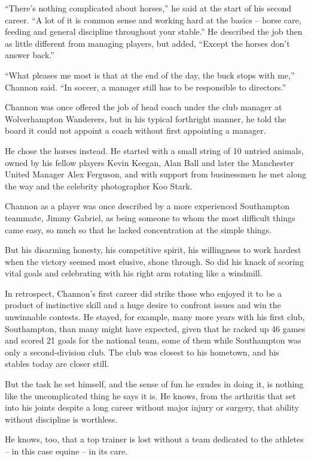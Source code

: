 ﻿\documentclass[12pt]{article}
\begin{document}
``There's nothing complicated about horses,'' he said at the start of his second career. ``A lot of
it is common sense and working hard at the basics -- horse care, feeding and general discipline
throughout your stable.'' He described the job then as little different from managing players, but
added, ``Except the horses don't answer back.''

``What pleases me most is that at the end of the day, the buck stops with me,'' Channon said. ``In
soccer, a manager still has to be responsible to directors.''

Channon was once offered the job of head coach under the club manager at Wolverhampton Wanderers,
but in his typical forthright manner, he told the board it could not appoint a coach without first
appointing a manager.

He chose the horses instead. He started with a small string of 10 untried animals, owned by his
fellow players Kevin Keegan, Alan Ball and later the Manchester United Manager Alex Ferguson, and
with support from businessmen he met along the way and the celebrity photographer Koo Stark.

Channon as a player was once described by a more experienced Southampton teammate, Jimmy Gabriel, as
being someone to whom the most difficult things came easy, so much so that he lacked concentration
at the simple things.

But his disarming honesty, his competitive spirit, his willingness to work hardest when the victory
seemed most elusive, shone through. So did his knack of scoring vital goals and celebrating with his
right arm rotating like a windmill.

In retrospect, Channon's first career did strike those who enjoyed it to be a product of instinctive
skill and a huge desire to confront issues and win the unwinnable contests. He stayed, for example,
many more years with his first club, Southampton, than many might have expected, given that he
racked up 46 games and scored 21 goals for the national team, some of them while Southampton was
only a second-division club. The club was closest to his hometown, and his stables today are closer
still.

But the task he set himself, and the sense of fun he exudes in doing it, is nothing like the
uncomplicated thing he says it is. He knows, from the arthritis that set into his joints despite a
long career without major injury or surgery, that ability without discipline is worthless.

He knows, too, that a top trainer is lost without a team dedicated to the athletes -- in this case
equine -- in its care.
\end{document}
